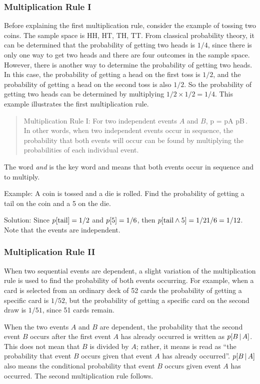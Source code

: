 \subsubsection{Multiplication Rule I}
Before explaining the first multiplication rule, consider the example of tossing two coins. The sample space is HH, HT, TH, TT. From classical probability theory, it can be determined that the probability of getting two heads is $1/4$, since there is only one way to get two heads and there are four outcomes in the sample space. However, there is another way to determine the probability of getting two heads. In this case, the probability of getting a head on the first toss is $1/2$, and the probability of getting a head on the second toss is also $1/2$. So the probability of getting two heads can be determined by multiplying $1/2\times 1/2 = 1/4$. This example illustrates the first multiplication rule.

\begin{quote}
Multiplication Rule I: For two independent events $A$ and $B$, 
\beq
p = p\vat A p\vat B\,.
\eeq
In other words, when two independent events occur in sequence, the probability that both events will occur can be found by multiplying the probabilities of each individual event.
\end{quote}
The word \emph{and} is the key word and means that both events occur in sequence and to multiply.

Example: A coin is tossed and a die is rolled. Find the probability of getting a tail on the coin and a 5 on the die.

Solution: Since $p\!\left[{\text{tail}}\right] = 1/2$ and $p\!\left[{\text{5}}\right] = 1/6$, then $p\!\left[{\text{tail}\land\text{5}}\right] = 1/2 1/6 = 1/12$. Note that the events are independent.


\subsubsection{Multiplication Rule II}
When two sequential events are dependent, a slight variation of the multiplication rule is used to find the probability of both events occurring. For example, when a card is selected from an ordinary deck of 52 cards the probability of getting a specific card is $1/52$, but the probability of getting a specific card on the second draw is $1/51$, since 51 cards remain.

When the two events $A$ and $B$ are dependent, the probability that the second event $B$ occurs after the first event $A$ has already occurred is written as $p\!\left[{B\operatorname{\vert} A}\right]$. This does not mean that $B$ is divided by $A$; rather, it means  is read as ``the probability that event $B$ occurs given that event $A$ has already occurred''. $p\!\left[{B\operatorname{\vert} A}\right]$ also means the conditional probability that event $B$ occurs given event $A$ has occurred. The second multiplication rule follows.

